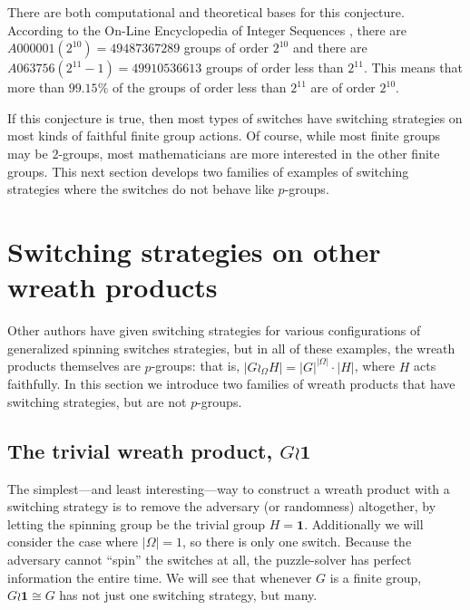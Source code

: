 There are both computational and theoretical bases for this conjecture.
According to the On-Line Encyclopedia of Integer Sequences \cite{oeis},
there are $A000001(2^{10}) = 49487367289$ groups of order $2^{10}$ and there are
$A063756(2^{11}-1) = 49910536613$ groups of order less than $2^{11}$.
This means that more than $99.15\%$ of the groups of order less than $2^{11}$
are of order $2^{10}$.

If this conjecture is true, then most types of switches have switching
strategies on most kinds of faithful finite group actions.
Of course, while most finite groups may be $2$-groups, most mathematicians
are more interested in the other finite groups.
This next section develops two families of examples of switching strategies
where the switches do not behave like $p$-groups.

%
%
\section{Switching strategies on other wreath products}
\label{sec:OtherSwitchingStrategies}

Other authors have given switching strategies for various configurations of
generalized spinning switches strategies, but in all of these examples,
the wreath products themselves are $p$-groups: that is,
${|G \wr_\Omega H| = |G|^{|\Omega|} \cdot |H|}$, where $H$ acts faithfully.
In this section we introduce two families of wreath products that have switching
strategies, but are not $p$-groups.

\subsection{The trivial wreath product, \texorpdfstring{$G \wr \mathbf{1}$}{G wreath trivial group}}
The simplest---and least interesting---way to construct a wreath product with
a switching strategy is to remove the adversary (or randomness) altogether,
by letting the spinning group be the trivial group $H = \mathbf{1}$.
Additionally we will consider the case where $|\Omega| = 1$, so there is only
one switch.
Because the adversary cannot ``spin'' the switches at all, the puzzle-solver has
perfect information the entire time.
We will see that whenever $G$ is a finite group,
$G \wr \mathbf{1} \cong G$ has not just one switching strategy, but many.

